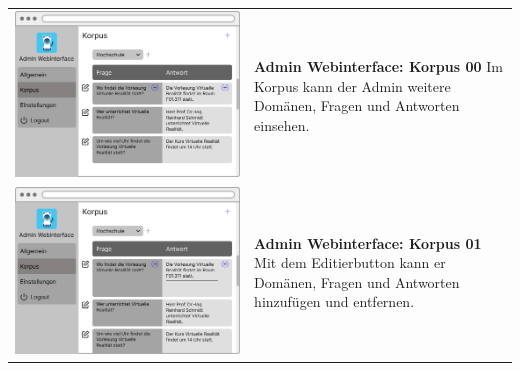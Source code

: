 \begin{tabular}{C{6cm}  L{7cm}}
    \includegraphics[width=\linewidth]{bilder/new vers. UI Design/Korpus/Admin Interface 00.png} & \textbf{Admin Webinterface: Korpus 00} \newline
    Im Korpus kann der Admin weitere Domänen, Fragen und Antworten einsehen.                                                                       \\
    \includegraphics[width=\linewidth]{bilder/new vers. UI Design/Korpus/Admin Interface 01.png} & \textbf{Admin Webinterface: Korpus 01} \newline
    Mit dem Editierbutton kann er Domänen, Fragen und Antworten hinzufügen und entfernen.                                                          \\

\end{tabular}
